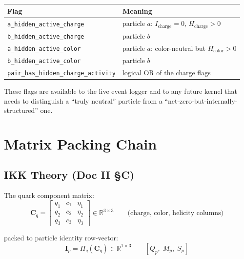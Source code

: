 \documentclass[11pt, a4paper, oneside]{article}
\newcommand{\Pack}{\Pi}
\theoremstyle{definition}
\theoremstyle{remark}
\begin{document}
\begin{center}
  \begin{tabular}{l l}
	\toprule
	Flag & Meaning \\
	\midrule
	\texttt{a\_hidden\_active\_charge} & particle $a$: $I_\text{charge}=0$, $H_\text{charge}>0$ \\
	\texttt{b\_hidden\_active\_charge} & particle $b$ \\
	\texttt{a\_hidden\_active\_color}  & particle $a$: color-neutral but $H_\text{color}>0$ \\
	\texttt{b\_hidden\_active\_color}  & particle $b$ \\
	\texttt{pair\_has\_hidden\_charge\_activity} & logical OR of the charge flags \\
	\bottomrule
  \end{tabular}
\end{center}

These flags are available to the live event logger and to any future kernel
that needs to distinguish a ``truly neutral'' particle from a
``net-zero-but-internally-structured'' one.

\section{Matrix Packing Chain}

\subsection{IKK Theory (Doc II \S C)}

The quark component matrix:
\begin{equation}
  \mathbf{C}_q =
  \begin{bmatrix}
	q_1 & c_1 & \eta_1 \\
	q_2 & c_2 & \eta_2 \\
	q_3 & c_3 & \eta_3
  \end{bmatrix}
  \in \mathbb{R}^{3\times 3}
  \qquad \text{(charge, color, helicity columns)}
\end{equation}

packed to particle identity row-vector:
\begin{equation}
  \mathbf{I}_p = \Pack_q(\mathbf{C}_q) \in \mathbb{R}^{1\times 3}
  \qquad [Q_p,\; M_p,\; S_p]
\end{equation}
\end{document}
